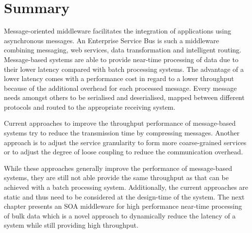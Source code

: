 \section{Summary}
Message-oriented middleware facilitates the integration of applications using asynchronous messages. An Enterprise Service Bus is such a middleware combining messaging, web services, data transformation and intelligent routing.
Message-based systems are able to provide near-time processing of data due to their lower latency compared with batch processing systems. The advantage of a lower latency comes with a performance cost in regard to a lower throughput because of the additional overhead for each processed message. Every message needs amongst others to be serialised and deserialised, mapped between different protocols and routed to the appropriate receiving system.

Current approaches to improve the throughput performance of message-based systems try to reduce the transmission time by compressing messages. Another approach is to adjust the service granularity to form more coarse-grained services or to adjust the degree of loose coupling to reduce the communication overhead.  

While these approaches generally improve the performance of message-based systems, they are still not able provide the same throughput as that can be achieved with a batch processing system. Additionally, the current approaches are static and thus need to be considered at the design-time of the system. The next chapter presents an SOA middleware for high performance near-time processing of bulk data which is a novel approach to dynamically reduce the latency of a system while still providing high throughput. 